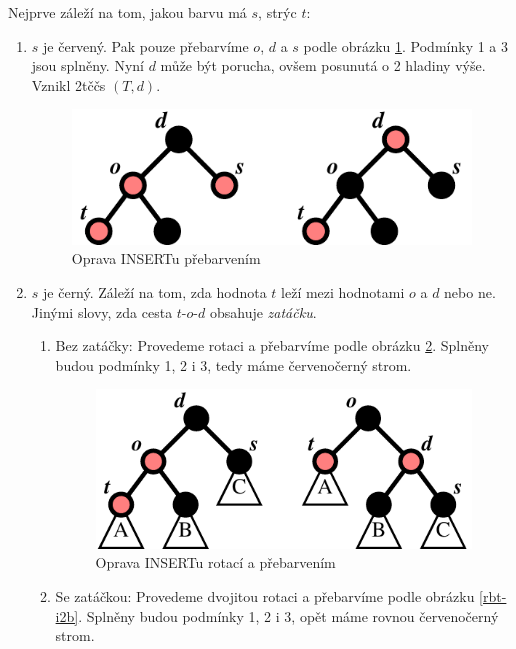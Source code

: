 Nejprve záleží na tom, jakou barvu má $s$, strýc $t$:
\begin{enumerate}
\item $s$ je červený. Pak pouze přebarvíme $o$, $d$ a $s$ podle
obrázku \ref{rbt-i1}.
Podmínky 1 a 3 jsou splněny. Nyní $d$ může být porucha, ovšem posunutá o 2
hladiny výše. Vznikl 2tččs $(T,d)$.

\begin{figure}[!htb]
\centering\includegraphics{pics/rbt-i1}
\caption{Oprava INSERTu přebarvením}
\label{rbt-i1}
\end{figure}

\item $s$ je černý. Záleží na tom, zda hodnota $t$ leží mezi hodnotami
$o$ a $d$ nebo ne. Jinými slovy, zda cesta $t$-$o$-$d$ obsahuje
\emph{zatáčku}.
\begin{enumerate}
\item Bez zatáčky:
Provedeme rotaci a přebarvíme podle obrázku \ref{rbt-i2a}.
Splněny budou podmínky 1, 2 i 3, tedy máme červenočerný strom.

\begin{figure}[!htb]
\centering\includegraphics{pics/rbt-i2a}
\caption{Oprava INSERTu rotací a přebarvením}
\label{rbt-i2a}
\end{figure}

\item Se zatáčkou:
Provedeme dvojitou rotaci a přebarvíme podle obrázku \ref{rbt-i2b}.
Splněny budou podmínky 1, 2 i 3, opět máme rovnou červenočerný strom.


\end{enumerate}
\end{enumerate}
